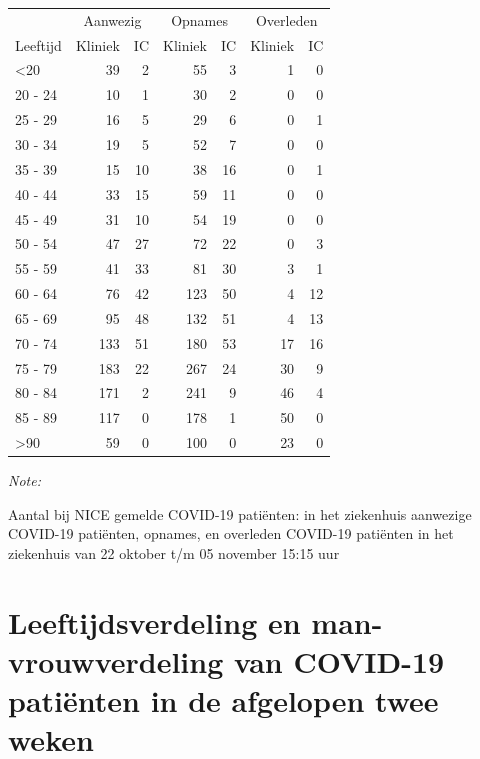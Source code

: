 \documentclass[
  english,
  man,floatsintext]{apa6}
\begin{document}
\begin{table}
\centering\begingroup\fontsize{10}{12}\selectfont

\begin{threeparttable}
\begin{tabular}{lrrrrrr}
\toprule
\multicolumn{1}{c}{ } & \multicolumn{2}{c}{Aanwezig} & \multicolumn{2}{c}{Opnames} & \multicolumn{2}{c}{Overleden} \\
\cmidrule(l{3pt}r{3pt}){2-3} \cmidrule(l{3pt}r{3pt}){4-5} \cmidrule(l{3pt}r{3pt}){6-7}
Leeftijd & Kliniek & IC & Kliniek & IC & Kliniek & IC\\
\midrule
<20 & 39 & 2 & 55 & 3 & 1 & 0\\
20 - 24 & 10 & 1 & 30 & 2 & 0 & 0\\
25 - 29 & 16 & 5 & 29 & 6 & 0 & 1\\
30 - 34 & 19 & 5 & 52 & 7 & 0 & 0\\
35 - 39 & 15 & 10 & 38 & 16 & 0 & 1\\
40 - 44 & 33 & 15 & 59 & 11 & 0 & 0\\
45 - 49 & 31 & 10 & 54 & 19 & 0 & 0\\
50 - 54 & 47 & 27 & 72 & 22 & 0 & 3\\
55 - 59 & 41 & 33 & 81 & 30 & 3 & 1\\
60 - 64 & 76 & 42 & 123 & 50 & 4 & 12\\
65 - 69 & 95 & 48 & 132 & 51 & 4 & 13\\
70 - 74 & 133 & 51 & 180 & 53 & 17 & 16\\
75 - 79 & 183 & 22 & 267 & 24 & 30 & 9\\
80 - 84 & 171 & 2 & 241 & 9 & 46 & 4\\
85 - 89 & 117 & 0 & 178 & 1 & 50 & 0\\
>90 & 59 & 0 & 100 & 0 & 23 & 0\\
\bottomrule
\end{tabular}
\begin{tablenotes}
\item \textit{Note: } 
\item Aantal bij NICE gemelde COVID-19 patiënten: in het ziekenhuis aanwezige COVID-19 patiënten, opnames, en overleden COVID-19 patiënten in het ziekenhuis van 22 oktober t/m 05 november 15:15 uur
\end{tablenotes}
\end{threeparttable}
\endgroup{}
\end{table}

\newpage

\hypertarget{leeftijdsverdeling-en-man-vrouwverdeling-van-covid-19-patiuxebnten-in-de-afgelopen-twee-weken}{%
\section{Leeftijdsverdeling en man-vrouwverdeling van COVID-19 patiënten in de afgelopen twee weken}\label{leeftijdsverdeling-en-man-vrouwverdeling-van-covid-19-patiuxebnten-in-de-afgelopen-twee-weken}}
\end{document}

